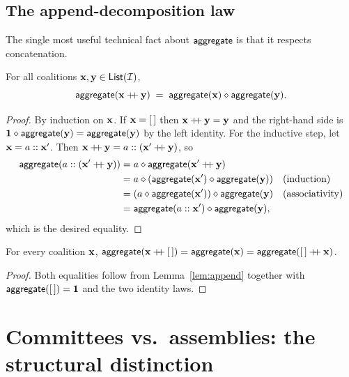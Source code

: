 \subsection*{The append-decomposition law}

The single most useful technical fact about $\mathsf{aggregate}$ is that it
respects concatenation.

\begin{lemma}\label{lem:append}
For all coalitions $\mathbf{x}, \mathbf{y} \in \mathsf{List}(\mathcal{I})$,
\[
  \mathsf{aggregate}(\mathbf{x} \mathbin{+\!\!+} \mathbf{y}) \;=\; \mathsf{aggregate}(\mathbf{x}) \mathbin{\diamond} \mathsf{aggregate}(\mathbf{y}).
\]
\end{lemma}

\begin{proof}
By induction on $\mathbf{x}$. If $\mathbf{x} = [\,]$ then $\mathbf{x} \mathbin{+\!\!+} \mathbf{y} = \mathbf{y}$
and the right-hand side is $\mathbf{1} \mathbin{\diamond} \mathsf{aggregate}(\mathbf{y}) =
\mathsf{aggregate}(\mathbf{y})$ by the left identity. For the inductive step, let
$\mathbf{x} = a :: \mathbf{x}'$. Then $\mathbf{x} \mathbin{+\!\!+} \mathbf{y} = a :: (\mathbf{x}' \mathbin{+\!\!+} \mathbf{y})$, so
\begin{align*}
  \mathsf{aggregate}(a :: (\mathbf{x}' \mathbin{+\!\!+} \mathbf{y}))
    &= a \mathbin{\diamond} \mathsf{aggregate}(\mathbf{x}' \mathbin{+\!\!+} \mathbf{y}) \\
    &= a \mathbin{\diamond} (\mathsf{aggregate}(\mathbf{x}') \mathbin{\diamond} \mathsf{aggregate}(\mathbf{y}))
       \quad\text{(induction)}\\
    &= (a \mathbin{\diamond} \mathsf{aggregate}(\mathbf{x}')) \mathbin{\diamond} \mathsf{aggregate}(\mathbf{y})
       \quad\text{(associativity)} \\
    &= \mathsf{aggregate}(a :: \mathbf{x}') \mathbin{\diamond} \mathsf{aggregate}(\mathbf{y}),
\end{align*}
which is the desired equality.
\end{proof}

\begin{corollary}\label{cor:trivside}
For every coalition $\mathbf{x}$, $\mathsf{aggregate}(\mathbf{x} \mathbin{+\!\!+} [\,]) =
\mathsf{aggregate}(\mathbf{x}) = \mathsf{aggregate}([\,] \mathbin{+\!\!+} \mathbf{x})$.
\end{corollary}

\begin{proof}
Both equalities follow from Lemma~\ref{lem:append} together with
$\mathsf{aggregate}([\,]) = \mathbf{1}$ and the two identity laws.
\end{proof}

\section{Committees vs.~assemblies: the structural distinction}
\label{sec:comm-ass}

